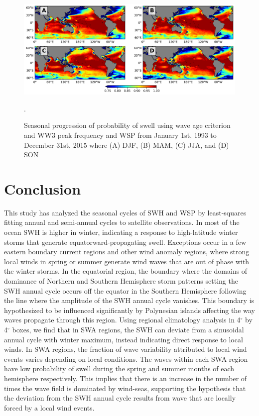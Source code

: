 \documentclass[12pt,twoside]{article}
\begin{document}
\begin{figure}[tbh]
\centering
\includegraphics[width=1.0\textwidth]{figs/probability_of_swell/WW3_CFSR_prob_swell_seasons_2x2.png}
\caption{Seasonal progression of probability of swell using wave age criterion and WW3 peak frequency and WSP from January 1st, 1993 to December 31st, 2015 where (A) DJF, (B) MAM, (C) JJA, and (D) SON}.
\label{prob_swell_ww3}
\end{figure}

\section{Conclusion}

This study has analyzed the seasonal cycles of SWH and WSP by least-squares fitting annual and semi-annual cycles to satellite observations. In most of the ocean SWH is higher in winter, indicating a response to high-latitude winter storms that generate equatorward-propagating swell. Exceptions occur in a few eastern boundary current regions and other wind anomaly regions, where strong local winds in spring or summer generate wind waves that are out of phase with the winter storms. In the equatorial region, the boundary where the domains of dominance of Northern and Southern Hemisphere storm patterns setting the SWH annual cycle occurs off the equator in the Southern Hemisphere following the line where the amplitude of the SWH annual cycle vanishes. This boundary is hypothesized to be influenced significantly by Polynesian islands affecting the way waves propagate through this region. Using regional climatology analysis in 4$^{\circ}$ by 4$^{\circ}$ boxes, we find that in SWA regions, the SWH can deviate from a sinusoidal annual cycle with winter maximum, instead indicating direct response to local winds. In SWA regions, the fraction of wave variability attributed to local wind events varies depending on local conditions. The waves within each SWA region have low probability of swell during the spring and summer months of each hemisphere respectively. This implies that there is an increase in the number of times the wave field is dominated by wind-seas, supporting the hypothesis that the deviation from the SWH annual cycle results from wave that are locally forced by a local wind events.
\end{document}
